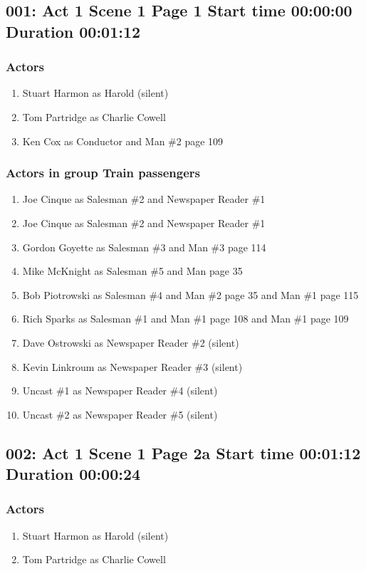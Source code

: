 \subsection{001: Act 1 Scene 1 Page 1 Start time 00:00:00 Duration 00:01:12}

\subsubsection{Actors}
\begin{enumerate}
\item Stuart Harmon as Harold (silent)
\item Tom Partridge as Charlie Cowell
\item Ken Cox as Conductor and Man \#2 page 109
\end{enumerate}
\subsubsection{Actors in group Train passengers}
\begin{enumerate}
\item Joe Cinque as Salesman \#2 and Newspaper Reader \#1
\item Joe Cinque as Salesman \#2 and Newspaper Reader \#1
\item Gordon Goyette as Salesman \#3 and Man \#3 page 114
\item Mike McKnight as Salesman \#5 and Man page 35
\item Bob Piotrowski as Salesman \#4 and Man \#2 page 35 and Man \#1 page 115
\item Rich Sparks as Salesman \#1 and Man \#1 page 108 and Man \#1 page 109
\item Dave Ostrowski as Newspaper Reader \#2 (silent)
\item Kevin Linkroum as Newspaper Reader \#3 (silent)
\item Uncast \#1 as Newspaper Reader \#4 (silent)
\item Uncast \#2 as Newspaper Reader \#5 (silent)
\end{enumerate}


\subsection{002: Act 1 Scene 1 Page 2a Start time 00:01:12 Duration 00:00:24}

\subsubsection{Actors}
\begin{enumerate}
\item Stuart Harmon as Harold (silent)
\item Tom Partridge as Charlie Cowell
\end{enumerate}
